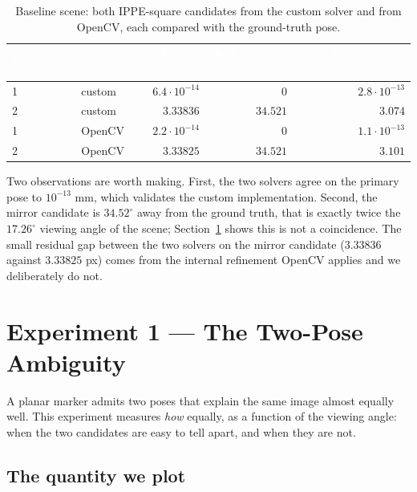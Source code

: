 \documentclass[11pt,a4paper]{article}
\theoremstyle{definition}
\theoremstyle{plain}
\theoremstyle{remark}
\newcommand{\thcell}[1]{\textcolor{white}{\textbf{#1}}}
\begin{document}
\begin{table}[h!]
\centering\small
\begin{tabularx}{\linewidth}{@{}YYrrr@{}}
\toprule
{}\thcell{Candidate}&\thcell{Solver}&\thcell{RMSE (px)}&\thcell{Rot.\ error ($^\circ$)}&\thcell{Transl.\ error (mm)}\\
&custom&$6.4\cdot10^{-14}$&$0$&$2.8\cdot10^{-13}$\\
 2&custom&$3.33836$&$34.521$&$3.074$\\
1&OpenCV&$2.2\cdot10^{-14}$&$0$&$1.1\cdot10^{-13}$\\
 2&OpenCV&$3.33825$&$34.521$&$3.101$\\
\bottomrule
\end{tabularx}
\caption{Baseline scene: both IPPE-square candidates from the custom solver and
from OpenCV, each compared with the ground-truth pose.}
\label{tab:baseline}
\end{table}

Two observations are worth making. First, the two solvers agree on the primary
pose to $10^{-13}$ mm, which validates the custom implementation. Second, the
mirror candidate is $34.52^\circ$ away from the ground truth, that is exactly
twice the $17.26^\circ$ viewing angle of the scene; Section~\ref{sec:experiment1}
shows this is not a coincidence. The small residual gap between the two
solvers on the mirror candidate ($3.33836$ against $3.33825$ px) comes from
the internal refinement OpenCV applies and we deliberately do not.

\section{Experiment 1 --- The Two-Pose Ambiguity}
\label{sec:experiment1}

A planar marker admits two poses that explain the same image almost equally
well. This experiment measures \emph{how} equally, as a function of the viewing
angle: when the two candidates are easy to tell apart, and when they are not.

\subsection{The quantity we plot}
\label{sec:rmse}
\end{document}

